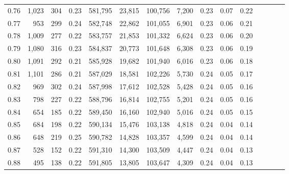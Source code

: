 \begin{tabular}{rrrcrrrrrrrrrrr}
0.76 &   1,023 &     304 &                                       0.23 &  581,795 &   23,815 &  100,756 &    7,200 &  0.23 &  0.07 &                         0.22 \\
0.77 &     953 &     299 &                                       0.24 &  582,748 &   22,862 &  101,055 &    6,901 &  0.23 &  0.06 &                         0.21 \\
0.78 &   1,009 &     277 &                                       0.22 &  583,757 &   21,853 &  101,332 &    6,624 &  0.23 &  0.06 &                         0.20 \\
0.79 &   1,080 &     316 &                                       0.23 &  584,837 &   20,773 &  101,648 &    6,308 &  0.23 &  0.06 &                         0.19 \\
0.80 &   1,091 &     292 &                                       0.21 &  585,928 &   19,682 &  101,940 &    6,016 &  0.23 &  0.06 &                         0.18 \\
0.81 &   1,101 &     286 &                                       0.21 &  587,029 &   18,581 &  102,226 &    5,730 &  0.24 &  0.05 &                         0.17 \\
0.82 &     969 &     302 &                                       0.24 &  587,998 &   17,612 &  102,528 &    5,428 &  0.24 &  0.05 &                         0.16 \\
0.83 &     798 &     227 &                                       0.22 &  588,796 &   16,814 &  102,755 &    5,201 &  0.24 &  0.05 &                         0.16 \\
0.84 &     654 &     185 &                                       0.22 &  589,450 &   16,160 &  102,940 &    5,016 &  0.24 &  0.05 &                         0.15 \\
0.85 &     684 &     198 &                                       0.22 &  590,134 &   15,476 &  103,138 &    4,818 &  0.24 &  0.04 &                         0.14 \\
0.86 &     648 &     219 &                                       0.25 &  590,782 &   14,828 &  103,357 &    4,599 &  0.24 &  0.04 &                         0.14 \\
0.87 &     528 &     152 &                                       0.22 &  591,310 &   14,300 &  103,509 &    4,447 &  0.24 &  0.04 &                         0.13 \\
0.88 &     495 &     138 &                                       0.22 &  591,805 &   13,805 &  103,647 &    4,309 &  0.24 &  0.04 &                         0.13 \\

\end{tabular}
